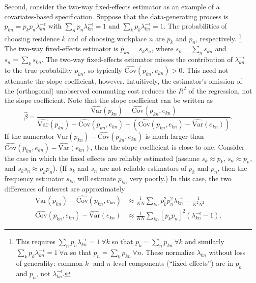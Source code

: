 \documentclass[11pt]{article}
\theoremstyle{definition}
\begin{document}
Second, consider the two-way fixed-effects estimator as an example of a covariates-based specification.
Suppose that the data-generating process is $p_{kn} = p_k p_n \lambda_{kn}^{-\epsilon}$
with $\sum_n p_n \lambda_{kn}^{-\epsilon} = 1$ and $\sum_k p_k \lambda_{kn}^{-\epsilon} = 1$.
The probabilities of choosing residence $k$ and of choosing workplace $n$ are
$p_k$ and $p_n$, respectively.%
\footnote{
    This requires
    $\sum_n p_n \lambda^{-\epsilon}_{kn} = 1 \ \forall k$
    so that $p_k = \sum_{n} p_{kn} \ \forall k$
    and similarly
    $\sum_{k} p_k \lambda^{-\epsilon}_{kn} = 1 \ \forall n$
    so that $p_n = \sum_{k} p_{kn} \ \forall n$.
    These normalize $\lambda_{kn}$ without loss of generality:
    common $k$- and $n$-level components (``fixed effects'') are in $p_k$ and $p_n$, not $\lambda^{-\epsilon}_{kn}$.
}
The two-way fixed-effects estimator is $\hat{p}_{kn} = s_k s_n$,
where $s_k = \sum_n s_{kn}$ and $s_n = \sum_k s_{kn}$.
The two-way fixed-effects estimator misses the contribution of $\lambda_{kn}^{-\epsilon}$ to the true probability $p_{kn}$,
so typically $\widehat{\text{Cov}}(p_{kn},e_{kn}) > 0$.
This need not attenuate the slope coefficient, however.
Intuitively, the estimator's omission of the (orthogonal) unobserved commuting cost reduces the $R^2$ of the regression, not the slope coefficient.
Note that the slope coefficient can be written as
\begin{equation*}
\hat{\beta}
=
\frac{\widehat{\text{Var}}(p_{kn}) - \widehat{\text{Cov}}(p_{kn},e_{kn})}{\widehat{\text{Var}}(p_{kn}) - \widehat{\text{Cov}}(p_{kn},e_{kn}) - \left(\widehat{\text{Cov}}(p_{kn},e_{kn}) - \widehat{\text{Var}}(e_{kn})\right)}
.\end{equation*}
\noindent If the numerator $\text{Var}(p_{kn}) - \widehat{\text{Cov}}(p_{kn},e_{kn})$ is much larger than $\widehat{\text{Cov}}(p_{kn},e_{kn}) - \widehat{\text{Var}}(e_{kn})$,
then the slope coefficient is close to one.
Consider the case in which the fixed effects are reliably estimated (assume $s_{k} \approx p_k$, $s_n \approx p_n$, and $s_k s_n \approx p_k p_n$).
(If $s_k$ and $s_n$ are not reliable estimators of $p_k$ and $p_n$, then the frequency estimator $s_{kn}$ will estimate $p_{kn}$ very poorly.)
In this case, the two differences of interest are approximately
\begin{align*}
\text{Var}(p_{kn}) - \widehat{\text{Cov}}(p_{kn},e_{kn})
&\approx
\frac{1}{KN} \sum_{kn} p_k^2 p_n^2\lambda_{kn}^{-\epsilon} - \frac{1}{K^2 N^2}
\\
\widehat{\text{Cov}}(p_{kn},e_{kn}) - \widehat{\text{Var}}(e_{kn})
&\approx
\frac{1}{KN} \sum_{kn} [p_k p_n]^2 (\lambda_{kn}^{-\epsilon} - 1)
.\end{align*}
\end{document}

